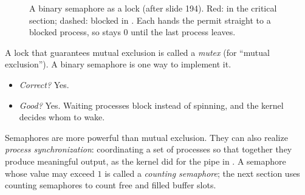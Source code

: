 \begin{figure}[htbp]
\centering
{}
\caption{A binary semaphore as a lock (after slide 194). Red: in the critical section; dashed: blocked in . Each  hands the permit straight to a blocked process, so  stays $0$ until the last process leaves.}
\label{fig:semlock}
\end{figure}

\begin{definition}[Mutex]
  A lock that guarantees mutual exclusion is called a \emph{mutex} (for ``mutual exclusion''). A binary semaphore is one way to implement it.
\end{definition}

\begin{itemize}
  \item \emph{Correct?} Yes.
  \item \emph{Good?} Yes. Waiting processes block instead of spinning, and the kernel decides whom to wake.
\end{itemize}

Semaphores are more powerful than mutual exclusion. They can also realize \emph{process synchronization}: coordinating a set of processes so that together they produce meaningful output, as the kernel did for the pipe in . A semaphore whose value may exceed $1$ is called a \emph{counting semaphore}; the next section uses counting semaphores to count free and filled buffer slots.

